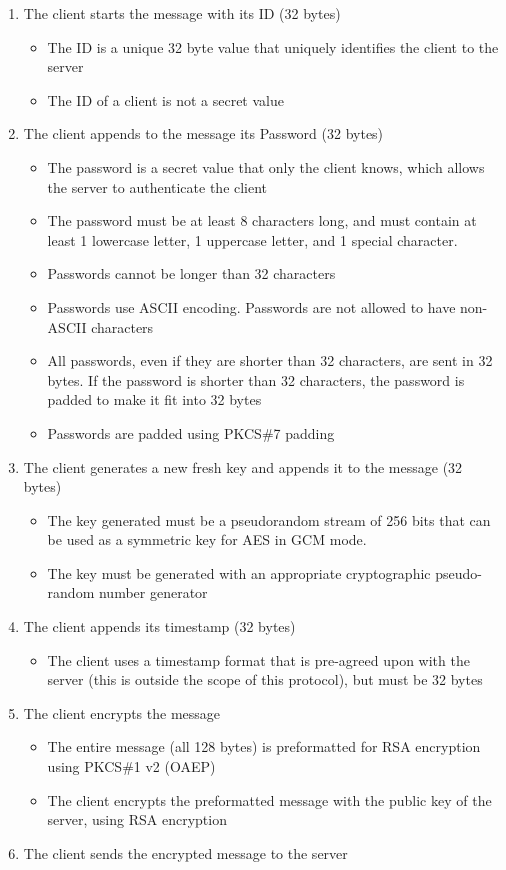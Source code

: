 \documentclass[12pt]{article}
\begin{document}
\begin{enumerate}
    \item The client starts the message with its ID (32 bytes)
    \begin{itemize}
        \item The ID is a unique 32 byte value that uniquely identifies the client to the server
        \item The ID of a client is not a secret value
    \end{itemize}
    \item The client appends to the message its Password (32 bytes)
    \begin{itemize}
        \item The password is a secret value that only the client knows, which allows the server to authenticate the client
        \item The password must be at least 8 characters long, and must contain at least 1 lowercase letter, 1 uppercase letter, and 1 special character.
        \item Passwords cannot be longer than 32 characters
        \item Passwords use ASCII encoding. Passwords are not allowed to have non-ASCII characters
        \item All passwords, even if they are shorter than 32 characters, are sent in 32 bytes. If the password is shorter than 32 characters, the password is padded to make it fit into 32 bytes
        \item Passwords are padded using PKCS\#7 padding
    \end{itemize}
    \item The client generates a new fresh key and appends it to the message (32 bytes)
    \begin{itemize}
        \item The key generated must be a pseudorandom stream of 256 bits that can be used as a symmetric key for AES in GCM mode.
        \item The key must be generated with an appropriate cryptographic pseudo-random number generator
    \end{itemize}
    \item The client appends its timestamp (32 bytes)
    \begin{itemize}
        \item The client uses a timestamp format that is pre-agreed upon with the server (this is outside the scope of this protocol), but must be 32 bytes
    \end{itemize}
    \item The client encrypts the message
    \begin{itemize}
        \item The entire message (all 128 bytes) is preformatted for RSA encryption using PKCS\#1 v2 (OAEP)
        \item The client encrypts the preformatted message with the public key of the server, using RSA encryption 
    \end{itemize}
    \item The client sends the encrypted message to the server

\end{enumerate}
\end{document}
